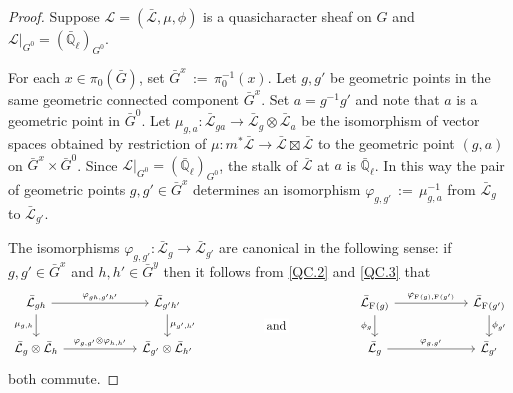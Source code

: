 \documentclass[11pt]{amsart}
\theoremstyle{plain}
\theoremstyle{definition}
\theoremstyle{remark}
\newcommand{\EE}{\mathbb{\bar Q}_\ell}
\newcommand{\Frob}[1]{\operatorname{F}_{#1}}
\newcommand{\ceq}{{\, :=\, }}
\newcommand{\qcs}[1]{{\mathcal{#1}}}
\newcommand{\gqcs}[1]{{\mathcal{\bar #1}}}
\newcommand{\bG}{\bar{G}}
\begin{document}
\begin{proof}
Suppose $\qcs{L} = (\gqcs{L},\mu,\phi)$ is a quasicharacter sheaf on $G$ 
and $\qcs{L}\vert_{G^0} = (\EE)_{G^0}$.

For each $x\in \pi_0(\bG)$, set $\bG^x \ceq \pi_0^{-1}(x)$.
Let $g, g'$ be geometric points in the same 
geometric connected component $\bG^x$. 
Set $a = g^{-1}g'$ and note that $a$ is a geometric point in $\bG^0$. 
Let $\mu_{g,a} : \gqcs{L}_{ga} \to \gqcs{L}_g \otimes \gqcs{L}_a$ 
be the isomorphism of vector spaces obtained by restriction of 
$\mu : m^*\gqcs{L} \to \gqcs{L} \boxtimes \gqcs{L}$ to the 
geometric point $(g,a)$ on $\bG^x \times \bG^0$. 
Since $\qcs{L}\vert_{G^0} = (\EE)_{G^0}$, 
the stalk of $\gqcs{L}$ at $a$ is $\EE$. 
In this way the pair of geometric points $g, g' \in \bG^x$ 
determines an isomorphism $\varphi_{g,g'} \ceq \mu_{g,a}^{-1}$ 
from $\gqcs{L}_{g}$ to $\gqcs{L}_{g'}$. 

The isomorphisms $\varphi_{g,g'}: \gqcs{L}_{g} \to \gqcs{L}_{g'}$ are canonical 
in the following sense: if $g,g'\in \bG^x$ and $h,h'\in \bG^y$ 
then it follows from \ref{QC.2} and \ref{QC.3} 
that
 \begin{equation}\label{eq:qc}
  \begin{tikzcd}[column sep=60]
   \gqcs{L}_{gh} \arrow{r}{\varphi_{gh,g'h'}} \arrow[swap]{d}{\mu_{g,h}}
  & \gqcs{L}_{g'h'} \arrow{d}{\mu_{g',h'}}
  &\arrow[draw=none]{d}[pos=.4,description]{\text{\normalsize{and}}} 
  &  \gqcs{L}_{\Frob{}(g)} \arrow{r}{\varphi_{\Frob{}(g),\Frob{}(g')}} \arrow[swap]{d}{\phi_{g}} & \gqcs{L}_{\Frob{}(g')} \arrow{d}{\phi_{g'}} \\
  \gqcs{L}_{g} \otimes \gqcs{L}_{h} \arrow{r}{\varphi_{g,g'}\otimes \varphi_{h,h'}}  
  & \gqcs{L}_{g'} \otimes \gqcs{L}_{h'} 
  & {}
  & \gqcs{L}_{g} \arrow{r}{\varphi_{g,g'}} & \gqcs{L}_{g'}
  \end{tikzcd}
 \end{equation}
both commute.


\end{proof}
\end{document}
